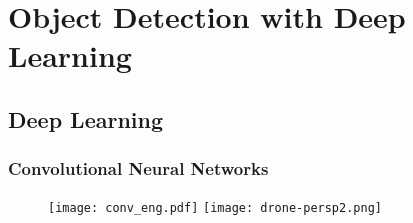 \documentclass{beamer}
\begin{document}
%
%
%







	\section{Object Detection with Deep Learning}

		\subsection{Deep Learning}

			\begin{frame}\frametitle{Convolutional Neural Networks}
				\begin{figure}[htb]
					\centering
					\texttt{[image: conv\_eng.pdf]}
					\texttt{[image: drone-persp2.png]}
					\label{fig:zframer1}
				\end{figure}
			\end{frame}
\end{document}
